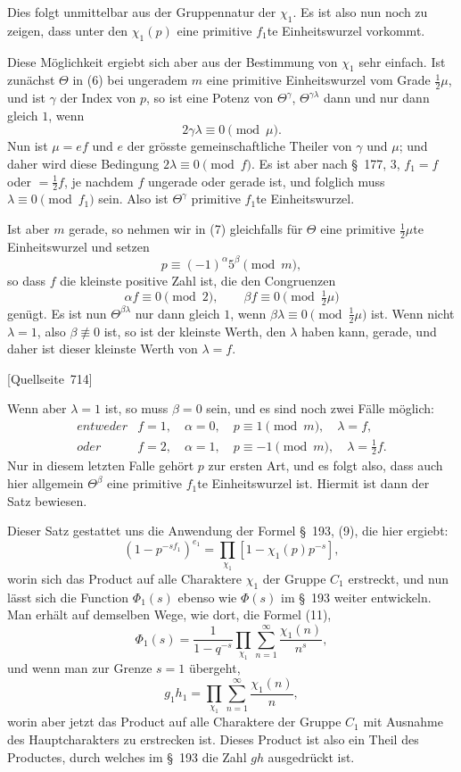 \documentclass[11pt]{article}
\newcommand{\srcpage}[1]{\par\medskip\noindent\textsf{[Quellseite~#1]}\par\smallskip}
\begin{document}
Dies folgt unmittelbar aus der Gruppennatur der $\chi_1$. Es ist also nun noch zu zeigen, dass unter den $\chi_1(p)$ eine primitive $f_1$te Einheitswurzel vorkommt.

Diese Möglichkeit ergiebt sich aber aus der Bestimmung von $\chi_1$ sehr einfach. Ist zunächst $\Theta$ in (6) bei ungeradem $m$ eine primitive Einheitswurzel vom Grade $\frac12\mu$, und ist $\gamma$ der Index von $p$, so ist eine Potenz von $\Theta^\gamma$, $\Theta^{\gamma\lambda}$ dann und nur dann gleich $1$, wenn
\[
2\gamma\lambda\equiv0\pmod\mu.
\]
Nun ist $\mu=ef$ und $e$ der grösste gemeinschaftliche Theiler von $\gamma$ und $\mu$; und daher wird diese Bedingung $2\lambda\equiv0\pmod f$. Es ist aber nach \S~177, 3, $f_1=f$ oder $=\frac12f$, je nachdem $f$ ungerade oder gerade ist, und folglich muss $\lambda\equiv0\pmod {f_1}$ sein. Also ist $\Theta^\gamma$ primitive $f_1$te Einheitswurzel.

Ist aber $m$ gerade, so nehmen wir in (7) gleichfalls für $\Theta$ eine primitive $\frac12\mu$te Einheitswurzel und setzen
\[
p\equiv(-1)^\alpha5^\beta\pmod m,
\]
so dass $f$ die kleinste positive Zahl ist, die den Congruenzen
\[
\alpha f\equiv0\pmod2,
\qquad
\beta f\equiv0\pmod{\tfrac12\mu}
\]
genügt. Es ist nun $\Theta^{\beta\lambda}$ nur dann gleich $1$, wenn $\beta\lambda\equiv0\pmod{\frac12\mu}$ ist. Wenn nicht $\lambda=1$, also $\beta\not\equiv0$ ist, so ist der kleinste Werth, den $\lambda$ haben kann, gerade, und daher ist dieser kleinste Werth von $\lambda=f$.

\srcpage{714}
Wenn aber $\lambda=1$ ist, so muss $\beta=0$ sein, und es sind noch zwei Fälle möglich:
\[
\begin{array}{ll}
entweder & f=1,\quad \alpha=0,\quad p\equiv1\pmod m,\quad \lambda=f,\\[2mm]
oder & f=2,\quad \alpha=1,\quad p\equiv-1\pmod m,\quad \lambda=\frac12f.
\end{array}
\]
Nur in diesem letzten Falle gehört $p$ zur ersten Art, und es folgt also, dass auch hier allgemein $\Theta^\beta$ eine primitive $f_1$te Einheitswurzel ist. Hiermit ist dann der Satz bewiesen.

Dieser Satz gestattet uns die Anwendung der Formel \S~193, (9), die hier ergiebt:
\begin{equation}
(1-p^{-sf_1})^{e_1}=\prod_{\chi_1}[1-\chi_1(p)p^{-s}],
\tag{8}
\end{equation}
worin sich das Product auf alle Charaktere $\chi_1$ der Gruppe $C_1$ erstreckt, und nun lässt sich die Function $\Phi_1(s)$ ebenso wie $\Phi(s)$ im \S~193 weiter entwickeln. Man erhält auf demselben Wege, wie dort, die Formel (11),
\begin{equation}
\Phi_1(s)=\frac1{1-q^{-s}}\prod_{\chi_1}\sum_{n=1}^{\infty}\frac{\chi_1(n)}{n^s},
\tag{9}
\end{equation}
und wenn man zur Grenze $s=1$ übergeht,
\begin{equation}
g_1h_1=\prod_{\chi_1}\sum_{n=1}^{\infty}\frac{\chi_1(n)}{n},
\tag{10}
\end{equation}
worin aber jetzt das Product auf alle Charaktere der Gruppe $C_1$ mit Ausnahme des Hauptcharakters zu erstrecken ist. Dieses Product ist also ein Theil des Productes, durch welches im \S~193 die Zahl $gh$ ausgedrückt ist.
\end{document}
